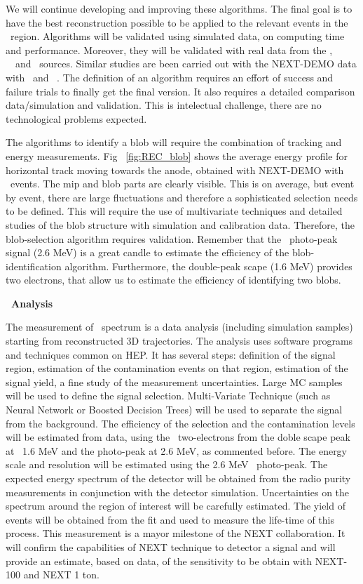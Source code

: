 We will continue developing and improving these algorithms.
The final goal is to have the best reconstruction possible to be applied to the relevant events in the \Qbb ~region. 
Algorithms will be validated using simulated data, on computing time  and performance. 
Moreover, they will be validated with real data from the \NA,  ~\CS ~and \Tl ~sources. Similar studies are been carried out with the NEXT-DEMO data with \NA ~and ~\CS.
The definition of an algorithm requires an effort of success and failure trials to finally get the final version. It also requires a detailed comparison data/simulation and validation. This is intelectual challenge, there are no technological problems expected.

The algorithms to identify a blob will require the combination of tracking and energy measurements. Fig ~\ref{fig:REC_blob} shows the average energy profile for horizontal track moving towards the anode, obtained with NEXT-DEMO with \NA ~events. The mip and blob parts are clearly visible. This is on average, but event by event, there are large fluctuations and therefore a sophisticated selection needs to be defined. This will require the use of multivariate techniques and detailed studies of the blob structure with simulation and calibration data.
Therefore, the blob-selection algorithm requires validation.
Remember that the \Tl ~photo-peak signal (2.6 MeV) is a great candle to estimate the efficiency of the blob-identification algorithm. Furthermore, the double-peak scape (1.6 MeV) provides two electrons, that allow us to estimate the efficiency of identifying two blobs. 

{\bf \bb ~Analysis}

The measurement of \bb ~spectrum is a data analysis (including simulation samples) starting from reconstructed 3D trajectories.
The analysis uses software programs and techniques common on HEP.
It has several steps: definition of the signal region, estimation of the contamination events on that region, estimation of the signal yield, a fine study of the measurement uncertainties.
Large MC samples will be used to define the signal selection. Multi-Variate Technique (such as Neural Network or Boosted Decision Trees) will be used to separate the signal from the background.
The efficiency of the selection and the contamination levels will be estimated from data, using the \Tl ~two-electrons from the doble scape peak at ~1.6 MeV and the photo-peak at 2.6 MeV, as commented before. The energy scale and resolution will be estimated using the 2.6 MeV \Tl ~photo-peak. The expected energy spectrum of the detector will be obtained from the radio purity measurements in conjunction with the detector simulation. Uncertainties on the spectrum around the region of interest will be carefully estimated.
The yield of \bb~ events will be obtained from the fit and used to measure the life-time of this process. 
This measurement is a mayor milestone of the NEXT collaboration. 
It will confirm the capabilities of NEXT technique to detector a \bbonu signal and will provide an estimate, based on data, of the sensitivity to be obtain with NEXT-100 and NEXT 1 ton. 

